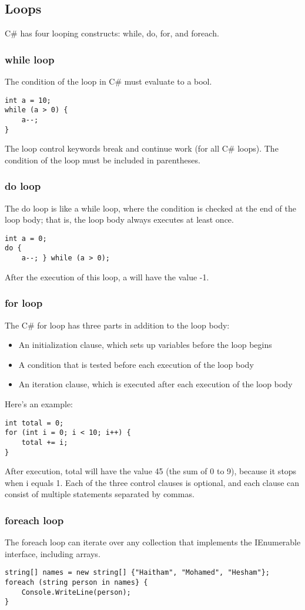 \documentclass[12pt,a4paper,final,twoside,onecolumn,titlepage]{book}
\begin{document}
\subsection{Loops}
C\# has four looping constructs: while, do, for, and foreach.
\subsubsection{while loop}
The condition of the loop in C\# must evaluate to a bool.
\begin{lstlisting}
int a = 10; 
while (a > 0) {
	a--;
}
\end{lstlisting}
The loop control keywords break and continue work (for all C\# loops). The condition of the loop must be included in parentheses.
\subsubsection{do loop}
The do loop is like a while loop, where the condition is checked at the end of the loop body; that is, the loop body always executes at least once.
\begin{lstlisting}
int a = 0; 
do {
	a--; } while (a > 0);
\end{lstlisting}
After the execution of this loop, a will have the value -1.


\subsubsection{for loop}
The C\# for loop has three parts in addition to the loop body:
\begin{itemize}
\item An initialization clause, which sets up variables before the loop begins 
\item A condition that is tested before each execution of the loop body 
\item An iteration clause, which is executed after each execution of the loop body
\end{itemize}
Here’s an example:
\begin{lstlisting}
int total = 0; 
for (int i = 0; i < 10; i++) {
	total += i;
}
\end{lstlisting}
After execution, total will have the value 45 (the sum of 0 to 9), because it stops when i equals 1. Each of the three control clauses is optional, and each clause can consist of multiple statements separated by commas.


\subsubsection{foreach loop}
The foreach loop can iterate over any collection that implements the IEnumerable interface, including arrays.
\begin{lstlisting}
string[] names = new string[] {"Haitham", "Mohamed", "Hesham"}; 
foreach (string person in names} {
	Console.WriteLine(person);
}
\end{lstlisting}
\end{document}
